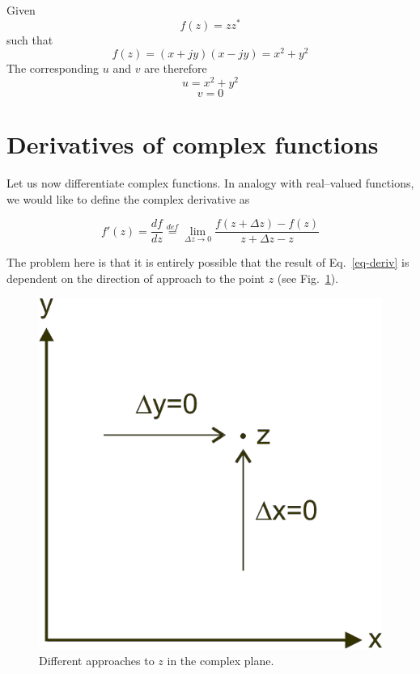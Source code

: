 \begin{sidebar}
\begin{exa}
Given
$$f(z) = z z^* $$
such that
$$f(z) = (x + jy)(x - jy) = x^2 + y^2$$
The corresponding $u$ and $v$ are therefore
$$u = x^2 + y^2$$
$$v = 0$$
\end{exa}
\end{sidebar}



\section{Derivatives of complex functions}

Let us now differentiate complex functions. In analogy with real--valued
functions, we would like to define the complex derivative as

\begin{equation}
f' (z)=\frac{df}{dz}  \stackrel{def}{=} \lim_{\Delta z \to 0} \frac{f(z+\Delta
z) - f(z)}{z+\Delta z - z} \label{eq-deriv}
\end{equation} 

The problem here is that it is entirely possible that the result of
Eq.~\ref{eq-deriv} is dependent on the direction of approach to the point $z$
(see Fig.~\ref{fig-approach-z}).

\begin{figure}
\centering
\includegraphics{complex/figures/approach_z}
\caption{Different approaches to $z$ in the complex plane.}
\label{fig-approach-z}
\end{figure}

